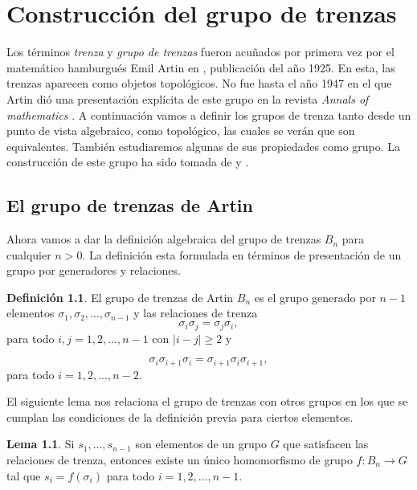 \documentclass[12pt]{book}
\theoremstyle{definition}
\newtheorem{defi}{Definición}[section]
\newtheorem{lema}{Lema}[section]
\begin{document}
\chapter{Construcción del grupo de trenzas}
\label{sec:cons_grtr}
Los términos \textit{trenza} y \textit{grupo de trenzas} fueron acuñados por primera vez por el matemático hamburgués Emil Artin en \cite{Art1}, publicación del año 1925. En esta, las trenzas aparecen como objetos topológicos. No fue hasta el año 1947 en el que Artin dió una presentación explícita de este grupo en la revista \textit{Annals of mathematics} \cite{Art2}. A continuación vamos a definir los grupos de trenza tanto desde un punto de vista algebraico, como topológico, las cuales se verán que son equivalentes. También estudiaremos algunas de sus propiedades como grupo. La construcción de este grupo ha sido tomada de  \cite{br_gr} y \cite{st_br}.

\section{El grupo de trenzas de Artin}



Ahora vamos a dar la definición algebraica del grupo de trenzas $B_n$ para cualquier $n>0$. La definición esta formulada en términos de presentación de un grupo por generadores y relaciones.

\begin{defi}
El grupo de trenzas de Artin $B_n$ es el grupo generado por $n-1$ elementos $\sigma_1, \sigma_2,...,\sigma_{n-1}$ y las relaciones de trenza
$$\sigma_i\sigma_j = \sigma_j\sigma_i,$$
para todo $i,j=1,2,...,n-1$ con $|i-j|\geq 2$ y

$$\sigma_i\sigma_{i+1}\sigma_i =\sigma_{i+1}\sigma_i\sigma_{i+1},$$
para todo $i=1,2,...,n-2$.
\label{defi:artin}
\end{defi}

El siguiente lema nos relaciona el grupo de trenzas con otros grupos en los que se cumplan las condiciones de la definición previa para ciertos elementos.

\begin{lema}
Si $s_1,...,s_{n-1}$ son elementos de un grupo $G$ que satisfacen las relaciones de trenza, entonces existe un único homomorfismo de grupo $f:B_n\rightarrow G$ tal que $s_i = f(\sigma_i)$ para todo $i=1,2,...,n-1$.
\label{uni_homo}
\end{lema}
\end{document}
